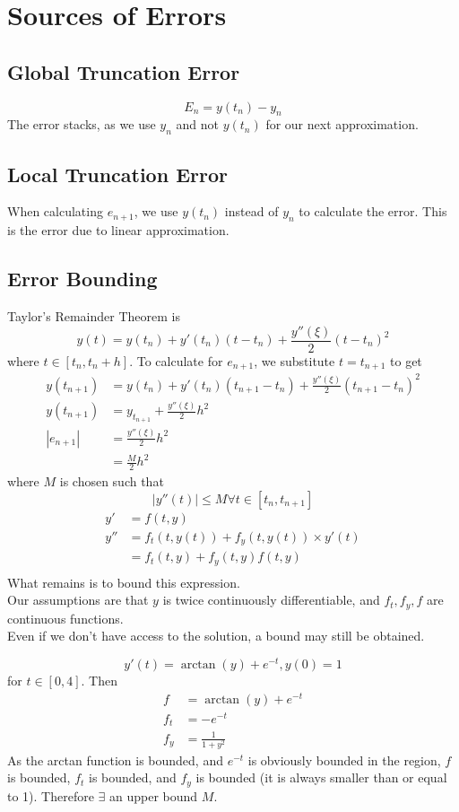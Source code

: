\documentclass[12pt]{article}
\begin{document}
\section{Sources of Errors}

\subsection{Global Truncation Error}
$$E_n = y(t_n) - y_n$$
The error stacks, as we use $y_n$ and not $y(t_n)$ for our next approximation.

\subsection{Local Truncation Error}
When calculating $e_{n+1}$, we use $y(t_n)$ instead of $y_n$ to calculate the error. This is the error due to linear approximation.

\subsection{Error Bounding}
Taylor's Remainder Theorem is
$$y(t) = y(t_n) + y'(t_n)(t-t_n) + \frac{y''(\xi)}{2}(t-t_n)^2$$
where $t \in [t_n,t_n+h]$. To calculate for $e_{n+1}$, we substitute $t = t_{n+1}$ to get
\begin{align*}
	y(t_{n+1}) &= y(t_n) + y'(t_n)(t_{n+1}-t_n) + \frac{y''(\xi)}{2}(t_{n+1}-t_n)^2 \\
	y(t_{n+1}) &= y_{t_{n+1}} + \frac{y''(\xi)}{2}h^2 \\
	|e_{n+1}| &= \frac{y''(\xi)}{2}h^2 \\
		  &= \frac{M}{2}h^2
\end{align*}
where $M$ is chosen such that
$$|y''(t)| \leq M \forall t\in[t_n,t_{n+1}]$$
\begin{align*}
	y' &= f(t,y) \\
	y'' &= f_t(t,y(t)) + f_y(t,y(t))\times y'(t) \\
	    &= f_t(t,y) + f_y(t,y)f(t,y) \\
\end{align*}
What remains is to bound this expression. \\
Our assumptions are that $y$ is twice continuously differentiable, and $f_t, f_y, f$ are continuous functions. \\
Even if we don't have access to the solution, a bound may still be obtained.

\begin{ex}
	$$y'(t) = \arctan(y) + e^{-t}, y(0) = 1$$
	for $t\in[0,4]$. Then
	\begin{align*}
		f &= \arctan(y) + e^{-t} \\
		f_t &= -e^{-t} \\
		f_y &= \frac{1}{1+y^2}
	\end{align*}
	As the arctan function is bounded, and $e^{-t}$ is obviously bounded in the region, $f$ is bounded, $f_t$ is bounded, and $f_y$ is bounded (it is always smaller than or equal to 1). Therefore $\exists$ an upper bound $M$.
\end{ex}
\end{document}
